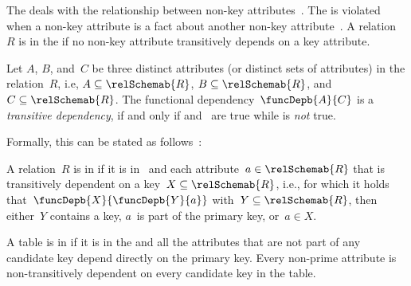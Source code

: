 %
\label{sec:normalForm:3}%
%
The  deals with the relationship between non-key attributes~\cite{C1971FNOTDBRM,C1971NDBSABT,K1983ASGTFNFIRDT,D2003AITDS,EN2015FODS}.
The  is violated when a non-key attribute is a fact about another non-key attribute~\cite{K1983ASGTFNFIRDT}.
A relation~$R$ is in the  if no non-key attribute transitively depends on a key attribute.
%
\begin{definition}%
\label{def:transitiveDependency}%
Let $A$, $B$, and~$C$ be three distinct attributes (or distinct sets of attributes) in the relation~$R$, i.e, $A\subseteq\relSchemab{R}$, $B\subseteq\relSchemab{R}$, and~$C\subseteq\relSchemab{R}$.
The functional dependency~$\funcDepb{A}{C}$ is a \emph{transitive dependency}, if and only if  and~ are true while  is \emph{not} true.%
\end{definition}%
%
Formally, this can be stated as follows~\cite{SS2005EIDDDFDB:SDWSD2}:%
%
\begin{definition}%
\label{def:3nf}%
A relation~$R$ is in  if it is in~ and each attribute~$a\in\relSchemab{R}$ that is transitively dependent on a key~$X\subseteq\relSchemab{R}$, i.e., for which it holds that~$\funcDepb{X}{\funcDepb{Y}{a}}$ with~$Y\subseteq\relSchemab{R}$, then either~$Y$ contains a key, $a$~is part of the primary key, or~$a\in X$.%
\end{definition}%
%
A table is in  if it is in the  and all the attributes that are not part of any candidate key depend directly on the primary key.
Every non-prime attribute is non-transitively dependent on every candidate key in the table.
%
%
%
\endhsection%
%
